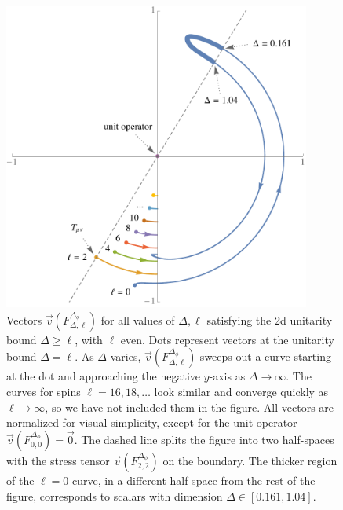 \documentclass{ws-rv9x6}
\newcommand\f\phi
\newcommand\<\langle
\renewcommand\>\rangle
\renewcommand\.{\cdot}
\newcommand\De{\Delta}
\newcommand\oo\infty
\begin{document}
\begin{figure}
\begin{center}
\includegraphics[width=0.9\textwidth]{2dVectorsExample}
\end{center}
\caption{Vectors $\vec v(F_{\De,\ell}^{\De_\f})$ for all values of $\De,\ell$ satisfying the 2d unitarity bound $\De\geq \ell$, with $\ell$ even.  Dots represent vectors at the unitarity bound $\De=\ell$.  As $\De$ varies, $\vec v(F_{\De,\ell}^{\De_\f})$ sweeps out a curve starting at the dot and approaching  the negative $y$-axis as $\De\to \oo$. The curves for spins $\ell=16,18,\dots$ look similar and converge quickly as $\ell\to \oo$, so we have not included them in the figure.  All vectors are normalized for visual simplicity, except for the unit operator $\vec v(F_{0,0}^{\De_\f})=\vec 0$.  The dashed line splits the figure into two half-spaces with the stress tensor $\vec v(F_{2,2}^{\De_\f})$ on the boundary.  The thicker region of the $\ell=0$ curve, in a different half-space from the rest of the figure, corresponds to scalars with dimension $\De\in[0.161,1.04]$.}
\label{fig:twodvectorsexample} 
\end{figure}
\end{document}

